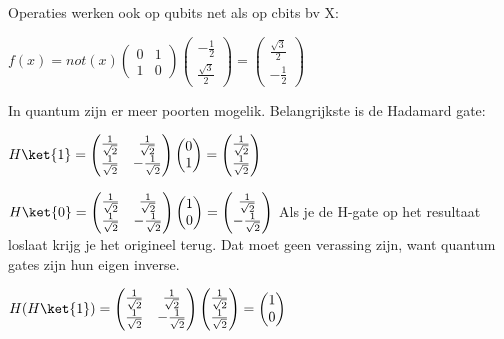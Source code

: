 Operaties werken ook op qubits net als op cbits bv X:

$f(x)=not(x)
\begin{pmatrix}
0&1\\
1&0
\end{pmatrix}
\begin{pmatrix}
-\tfrac{1}{2}\\
\tfrac{\sqrt{3}}{2}
\end{pmatrix}
=
\begin{pmatrix}
\tfrac{\sqrt{3}}{2}\\
-\tfrac{1}{2}
\end{pmatrix}
$

In quantum zijn er meer poorten mogelik.
Belangrijkste is de Hadamard gate:

$H\ket{1}=
\begin{pmatrix} 
\tfrac{1}{\sqrt{2}} & \tfrac{1}{\sqrt{2}}  \\ 
\tfrac{1}{\sqrt{2}} & -\tfrac{1}{\sqrt{2}} 
\end{pmatrix} 
\begin{pmatrix} 
0  \\ 
1
\end{pmatrix} 
=
\begin{pmatrix} 
\tfrac{1}{\sqrt{2}}\\
\tfrac{1}{\sqrt{2}}
\end{pmatrix} 
$

$H\ket{0}=
\begin{pmatrix} 
\tfrac{1}{\sqrt{2}} & \tfrac{1}{\sqrt{2}}  \\ 
\tfrac{1}{\sqrt{2}} & -\tfrac{1}{\sqrt{2}} 
\end{pmatrix} 
\begin{pmatrix} 
1  \\ 
0
\end{pmatrix} 
=
\begin{pmatrix} 
\tfrac{1}{\sqrt{2}}\\
-\tfrac{1}{\sqrt{2}}
\end{pmatrix} 
$
Als je de H-gate op het resultaat loslaat krijg je het origineel terug. Dat moet geen verassing zijn, want quantum gates zijn hun eigen inverse.

$H(H\ket{1})=
\begin{pmatrix} 
\tfrac{1}{\sqrt{2}} & \tfrac{1}{\sqrt{2}}  \\ 
\tfrac{1}{\sqrt{2}} & -\tfrac{1}{\sqrt{2}} 
\end{pmatrix} 
\begin{pmatrix} 
\tfrac{1}{\sqrt{2}}  \\ 
\tfrac{1}{\sqrt{2}}
\end{pmatrix} 
=
\begin{pmatrix} 
1\\
0
\end{pmatrix} 
$

